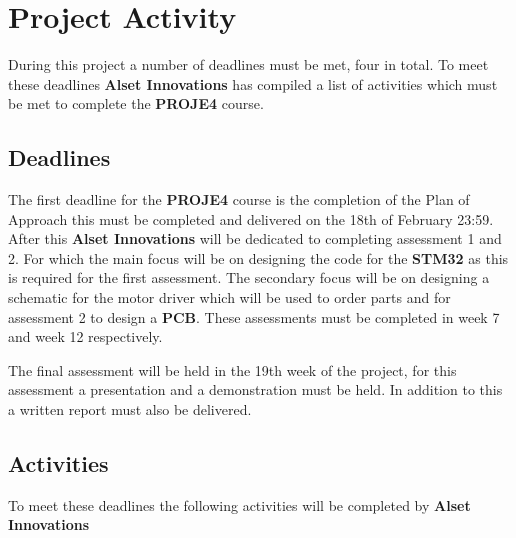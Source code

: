 \section{Project Activity}
During this project a number of deadlines must be met, four in total. To meet these deadlines \textbf{Alset Innovations} has compiled a list of activities which must be met to complete the \textbf{PROJE4} course.

\subsection{Deadlines}
The first deadline for the \textbf{PROJE4} course is the completion of the Plan of Approach this must be completed and delivered on the 18th of February 23:59. After this \textbf{Alset Innovations} will be dedicated to completing assessment 1 and 2. For which the main focus will be on designing the code for the \textbf{STM32} as this is required for the first assessment. The secondary focus will be on designing a schematic for the motor driver which will be used to order parts and for assessment 2 to design a \textbf{PCB}. These assessments must be completed in week 7 and week 12 respectively.

The final assessment will be held in the 19th week of the project, for this assessment a presentation and a demonstration must be held. In addition to this a written report must also be delivered.

\subsection{Activities}
To meet these deadlines the following activities will be completed by \textbf{Alset Innovations}

